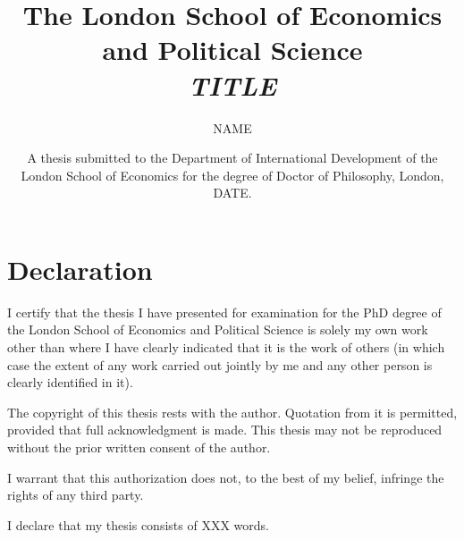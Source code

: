 \documentclass[12pt]{article}
\begin{document}
 
 



\title{{\textbf{\Large{The London School of Economics and Political Science}}\\ 
\bigskip\bigskip\bigskip\bigskip\bigskip\bigskip\bigskip\bigskip\bigskip\bigskip\bigskip  \emph{TITLE \bigskip\bigskip\bigskip\bigskip\bigskip\bigskip\bigskip\bigskip\bigskip\bigskip\bigskip\bigskip}}}




\author{\Large{NAME \bigskip\bigskip\bigskip\bigskip\bigskip\bigskip\bigskip\bigskip\bigskip\bigskip\bigskip\bigskip\bigskip\bigskip}}



\date{\normalsize{A thesis submitted to the Department of International Development of the London School of Economics for the degree of Doctor of Philosophy, London, DATE.}}







\maketitle
\thispagestyle{empty}


\newpage \doublespacing


\section*{\textbf{\bigskip\bigskip\bigskip\bigskip\bigskip \Large{Declaration}}}

I certify that the thesis I have presented for examination for the PhD degree of the London School of Economics and Political Science is solely my own work other than where I have clearly indicated that it is the work of others (in which case the extent of any work carried out jointly by me and any other person is clearly identified in it).

The copyright of this thesis rests with the author. Quotation from it is permitted, provided that full acknowledgment is made. This thesis may not be reproduced without the prior written consent of the author.

I warrant that this authorization does not, to the best of my belief, infringe the rights of any third party.

I declare that my thesis consists of XXX words.

\bigskip
\bigskip
\bigskip
\bigskip
\bigskip
\bigskip
\bigskip
\bigskip
\bigskip
\end{document}
